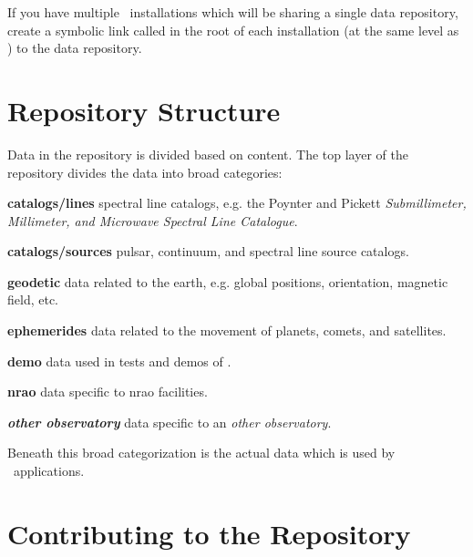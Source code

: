 If you have multiple \aipspp\ installations which will be sharing a single
data repository, create a symbolic link called  in the root of
each installation (at the same level as ) to the data repository.

\section{Repository Structure}
\label{data repository structure}

Data in the repository is divided based on content. The top layer of the
repository divides the data into broad categories:

\begin{list}{}{\setlength{\rightmargin}{\leftmargin}}

\item{\textbf{catalogs/lines}} spectral line catalogs, e.g. the Poynter and Pickett \textit{Submillimeter, Millimeter, and Microwave Spectral Line Catalogue}.

\item{\textbf{catalogs/sources}} pulsar, continuum, and spectral line source catalogs.

\item{\textbf{geodetic}} data related to the earth, e.g. global positions, orientation,
magnetic field, etc.

\item{\textbf{ephemerides}} data related to the movement of planets, comets, and satellites.

\item{\textbf{demo}} data used in tests and demos of \aipspp.

\item{\textbf{nrao}} data specific to nrao facilities.

\item{\textbf{\textit{other observatory}}} data specific to an \textit{other observatory}.

\end{list}

\noindent
Beneath this broad categorization is the actual data which is used by
\aipspp\ applications.


\section{Contributing to the Repository}
\label{data repository contributing}

